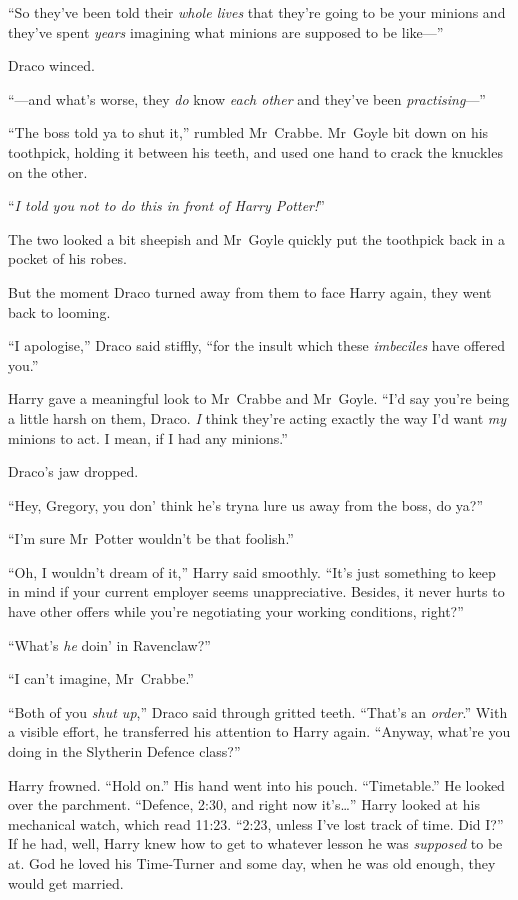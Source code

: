 “So they’ve been told their \emph{whole lives} that they’re going to be your minions and they’ve spent \emph{years} imagining what minions are supposed to be like—”

Draco winced.

“—and what’s worse, they \emph{do} know \emph{each other} and they’ve been \emph{practising}—”

“The boss told ya to shut it,” rumbled Mr~Crabbe. Mr~Goyle bit down on his toothpick, holding it between his teeth, and used one hand to crack the knuckles on the other.

“\emph{I told you not to do this in front of Harry Potter!}”

The two looked a bit sheepish and Mr~Goyle quickly put the toothpick back in a pocket of his robes.

But the moment Draco turned away from them to face Harry again, they went back to looming.

“I apologise,” Draco said stiffly, “for the insult which these \emph{imbeciles} have offered you.”

Harry gave a meaningful look to Mr~Crabbe and Mr~Goyle. “I’d say you’re being a little harsh on them, Draco. \emph{I} think they’re acting exactly the way I’d want \emph{my} minions to act. I mean, if I had any minions.”

Draco’s jaw dropped.

“Hey, Gregory, you don’ think he’s tryna lure us away from the boss, do ya?”

“I’m sure Mr~Potter wouldn’t be that foolish.”

“Oh, I wouldn’t dream of it,” Harry said smoothly. “It’s just something to keep in mind if your current employer seems unappreciative. Besides, it never hurts to have other offers while you’re negotiating your working conditions, right?”

“What’s \emph{he} doin’ in Ravenclaw?”

“I can’t imagine, Mr~Crabbe.”

“Both of you \emph{shut up},” Draco said through gritted teeth. “That’s an \emph{order}.” With a visible effort, he transferred his attention to Harry again. “Anyway, what’re you doing in the Slytherin Defence class?”

Harry frowned. “Hold on.” His hand went into his pouch. “Timetable.” He looked over the parchment. “Defence, 2:30\pm, and right now it’s…” Harry looked at his mechanical watch, which read 11:23. “2:23, unless I’ve lost track of time. Did I?” If he had, well, Harry knew how to get to whatever lesson he was \emph{supposed} to be at. God he loved his Time-Turner and some day, when he was old enough, they would get married.

